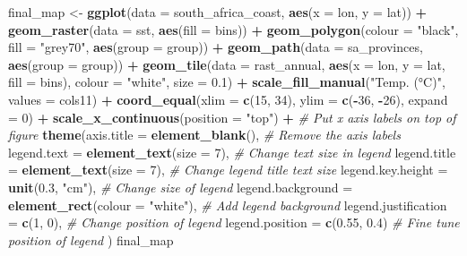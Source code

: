 \documentclass[]{book}
\newenvironment{Shaded}{\begin{snugshade}}{\end{snugshade}}
\newcommand{\KeywordTok}[1]{\textcolor[rgb]{0.13,0.29,0.53}{\textbf{#1}}}
\newcommand{\DataTypeTok}[1]{\textcolor[rgb]{0.13,0.29,0.53}{#1}}
\newcommand{\DecValTok}[1]{\textcolor[rgb]{0.00,0.00,0.81}{#1}}
\newcommand{\FloatTok}[1]{\textcolor[rgb]{0.00,0.00,0.81}{#1}}
\newcommand{\StringTok}[1]{\textcolor[rgb]{0.31,0.60,0.02}{#1}}
\newcommand{\CommentTok}[1]{\textcolor[rgb]{0.56,0.35,0.01}{\textit{#1}}}
\newcommand{\OperatorTok}[1]{\textcolor[rgb]{0.81,0.36,0.00}{\textbf{#1}}}
\newcommand{\NormalTok}[1]{#1}
\theoremstyle{definition}
\theoremstyle{definition}
\theoremstyle{definition}
\theoremstyle{remark}
\begin{document}
\begin{Shaded}
\begin{Highlighting}[]
\NormalTok{final_map <-}\StringTok{ }\KeywordTok{ggplot}\NormalTok{(}\DataTypeTok{data =}\NormalTok{ south_africa_coast, }\KeywordTok{aes}\NormalTok{(}\DataTypeTok{x =}\NormalTok{ lon, }\DataTypeTok{y =}\NormalTok{ lat)) }\OperatorTok{+}
\StringTok{  }\KeywordTok{geom_raster}\NormalTok{(}\DataTypeTok{data =}\NormalTok{ sst, }\KeywordTok{aes}\NormalTok{(}\DataTypeTok{fill =}\NormalTok{ bins)) }\OperatorTok{+}
\StringTok{  }\KeywordTok{geom_polygon}\NormalTok{(}\DataTypeTok{colour =} \StringTok{"black"}\NormalTok{, }\DataTypeTok{fill =} \StringTok{"grey70"}\NormalTok{, }\KeywordTok{aes}\NormalTok{(}\DataTypeTok{group =}\NormalTok{ group)) }\OperatorTok{+}
\StringTok{  }\KeywordTok{geom_path}\NormalTok{(}\DataTypeTok{data =}\NormalTok{ sa_provinces, }\KeywordTok{aes}\NormalTok{(}\DataTypeTok{group =}\NormalTok{ group)) }\OperatorTok{+}
\StringTok{  }\KeywordTok{geom_tile}\NormalTok{(}\DataTypeTok{data =}\NormalTok{ rast_annual, }\KeywordTok{aes}\NormalTok{(}\DataTypeTok{x =}\NormalTok{ lon, }\DataTypeTok{y =}\NormalTok{ lat, }\DataTypeTok{fill =}\NormalTok{ bins), }
            \DataTypeTok{colour =} \StringTok{"white"}\NormalTok{, }\DataTypeTok{size =} \FloatTok{0.1}\NormalTok{) }\OperatorTok{+}
\StringTok{  }\KeywordTok{scale_fill_manual}\NormalTok{(}\StringTok{"Temp. (°C)"}\NormalTok{, }\DataTypeTok{values =}\NormalTok{ cols11) }\OperatorTok{+}
\StringTok{  }\KeywordTok{coord_equal}\NormalTok{(}\DataTypeTok{xlim =} \KeywordTok{c}\NormalTok{(}\DecValTok{15}\NormalTok{, }\DecValTok{34}\NormalTok{), }\DataTypeTok{ylim =} \KeywordTok{c}\NormalTok{(}\OperatorTok{-}\DecValTok{36}\NormalTok{, }\OperatorTok{-}\DecValTok{26}\NormalTok{), }\DataTypeTok{expand =} \DecValTok{0}\NormalTok{) }\OperatorTok{+}
\StringTok{  }\KeywordTok{scale_x_continuous}\NormalTok{(}\DataTypeTok{position =} \StringTok{"top"}\NormalTok{) }\OperatorTok{+}\StringTok{ }\CommentTok{# Put x axis labels on top of figure}
\StringTok{  }\KeywordTok{theme}\NormalTok{(}\DataTypeTok{axis.title =} \KeywordTok{element_blank}\NormalTok{(), }\CommentTok{# Remove the axis labels}
        \DataTypeTok{legend.text =} \KeywordTok{element_text}\NormalTok{(}\DataTypeTok{size =} \DecValTok{7}\NormalTok{), }\CommentTok{# Change text size in legend}
        \DataTypeTok{legend.title =} \KeywordTok{element_text}\NormalTok{(}\DataTypeTok{size =} \DecValTok{7}\NormalTok{), }\CommentTok{# Change legend title text size}
        \DataTypeTok{legend.key.height =} \KeywordTok{unit}\NormalTok{(}\FloatTok{0.3}\NormalTok{, }\StringTok{"cm"}\NormalTok{), }\CommentTok{# Change size of legend}
        \DataTypeTok{legend.background =} \KeywordTok{element_rect}\NormalTok{(}\DataTypeTok{colour =} \StringTok{"white"}\NormalTok{), }\CommentTok{# Add legend background}
        \DataTypeTok{legend.justification =} \KeywordTok{c}\NormalTok{(}\DecValTok{1}\NormalTok{, }\DecValTok{0}\NormalTok{), }\CommentTok{# Change position of legend}
        \DataTypeTok{legend.position =} \KeywordTok{c}\NormalTok{(}\FloatTok{0.55}\NormalTok{, }\FloatTok{0.4}\NormalTok{) }\CommentTok{# Fine tune position of legend}
\NormalTok{        )}
\NormalTok{final_map}
\end{Highlighting}
\end{Shaded}
\end{document}
